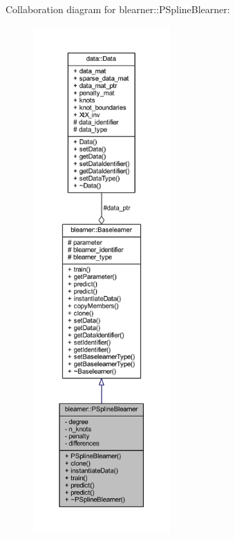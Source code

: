 Collaboration diagram for blearner\+:\+:P\+Spline\+Blearner\+:\nopagebreak
\begin{figure}[H]
\begin{center}
\leavevmode
\includegraphics[height=550pt]{classblearner_1_1_p_spline_blearner__coll__graph}
\end{center}
\end{figure}
